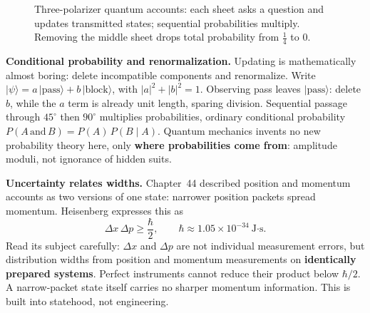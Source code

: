 \begin{figure}[htbp]
\centering
{}
\caption{Three-polarizer quantum accounts: each sheet asks a question and updates transmitted states; sequential probabilities multiply. Removing the middle sheet drops total probability from $\tfrac14$ to $0$.}
\end{figure}

\begin{mathbridge}
\textbf{Conditional probability and renormalization.} Updating is mathematically almost boring: delete incompatible components and renormalize. Write $|\psi\rangle=a\,|\text{pass}\rangle+b\,|\text{block}\rangle$, with $|a|^2+|b|^2=1$. Observing pass leaves $|\text{pass}\rangle$: delete $b$, while the $a$ term is already unit length, sparing division. Sequential passage through $45^\circ$ then $90^\circ$ multiplies probabilities, ordinary conditional probability $P(A\,\text{and}\,B)=P(A)\,P(B\mid A)$. Quantum mechanics invents no new probability theory here, only \textbf{where probabilities come from}: amplitude moduli, not ignorance of hidden suits.

\textbf{Uncertainty relates widths.} Chapter~44 described position and momentum accounts as two versions of one state: narrower position packets spread momentum. Heisenberg expresses this as
\[
\Delta x\,\Delta p\geq \frac{\hbar}{2},\qquad \hbar\approx 1.05\times10^{-34}\ \text{J·s}.
\]
Read its subject carefully: $\Delta x$ and $\Delta p$ are not individual measurement errors, but distribution widths from position and momentum measurements on \textbf{identically prepared systems}. Perfect instruments cannot reduce their product below $\hbar/2$. A narrow-packet state itself carries no sharper momentum information. This is built into statehood, not engineering.
\end{mathbridge}

